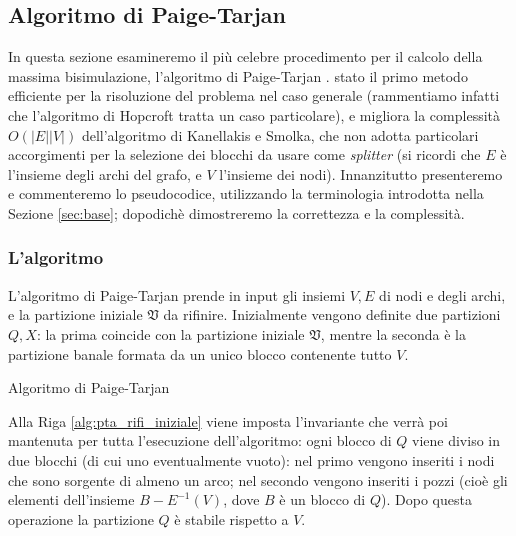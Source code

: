 \subsection{Algoritmo di Paige-Tarjan}
\label{sec:pta}
In questa sezione esamineremo il più celebre procedimento per il calcolo della massima bisimulazione, l'algoritmo di Paige-Tarjan \cite{paigetarjan}. \accente stato il primo metodo efficiente per la risoluzione del problema nel caso generale (rammentiamo infatti che l'algoritmo di Hopcroft tratta un caso particolare), e migliora la complessità $O(|E||V|)$ dell'algoritmo di Kanellakis e Smolka, che non adotta particolari accorgimenti per la selezione dei blocchi da usare come \emph{splitter} (si ricordi che $E$ è l'insieme degli archi del grafo, e $V$ l'insieme dei nodi). Innanzitutto presenteremo e commenteremo lo pseudocodice, utilizzando la terminologia introdotta nella Sezione \ref{sec:base}; dopodichè dimostreremo la correttezza e la complessità.

\subsubsection{L'algoritmo}
L'algoritmo di Paige-Tarjan prende in input gli insiemi $V, E$ di nodi e degli archi, e la partizione iniziale $\mathfrak{V}$ da rifinire.
Inizialmente vengono definite due partizioni $Q,X$: la prima coincide con la partizione iniziale $\mathfrak{V}$, mentre la seconda è la partizione banale formata da un unico blocco contenente tutto $V$.

\begin{algorithm}[H]
    \label{alg:pt}
    \caption{Algoritmo di Paige-Tarjan}
\end{algorithm}

Alla Riga \ref{alg:pta_rifi_iniziale} viene imposta l'invariante che verrà poi mantenuta per tutta l'esecuzione dell'algoritmo: ogni blocco di $Q$ viene diviso in due blocchi (di cui uno eventualmente vuoto): nel primo vengono inseriti i nodi che sono sorgente di almeno un arco; nel secondo vengono inseriti i pozzi (cioè gli elementi dell'insieme $B - E^{-1}(V)$, dove $B$ è un blocco di $Q$). Dopo questa operazione la partizione $Q$ è stabile rispetto a $V$.

